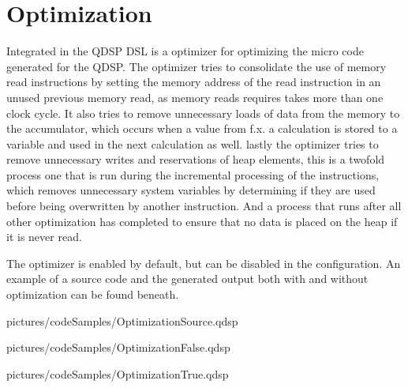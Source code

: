 \chapter{Optimization}
Integrated in the QDSP DSL is a optimizer for optimizing the micro code generated for the QDSP. The optimizer tries to consolidate the use of memory read instructions by setting the memory address of the read instruction in an unused previous memory read, as memory reads requires takes more than one clock cycle. It also tries to remove unnecessary loads of data from the memory to the accumulator, which occurs when a value from f.x. a calculation is stored to a variable and used in the next calculation as well. lastly the optimizer tries to remove unnecessary writes and reservations of heap elements, this is a twofold process one that is run during the incremental processing of the instructions, which removes unnecessary system variables by determining if they are used before being overwritten by another instruction. And a process that runs after all other optimization has completed to ensure that no data is placed on the heap if it is never read.

The optimizer is enabled by default, but can be disabled in the configuration. An example of a source code and the generated output both with and without optimization can be found beneath. 





  {pictures/codeSamples/OptimizationSource.qdsp}
	
	

  {pictures/codeSamples/OptimizationFalse.qdsp}
	
	

  {pictures/codeSamples/OptimizationTrue.qdsp}
	